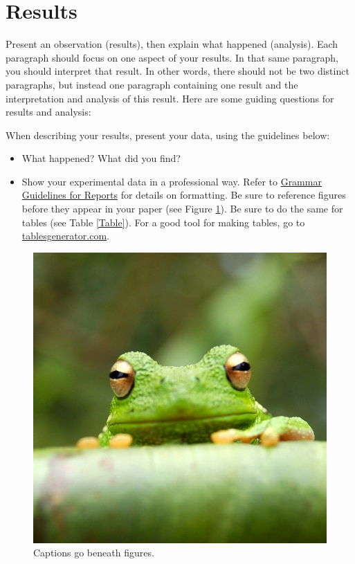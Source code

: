 \documentclass[a4paper]{article}
\begin{document}

\section* {Results}
Present an observation (results), then explain what happened (analysis).  Each paragraph should focus on one aspect of your results. In that same paragraph, you should interpret that result.
In other words, there should not be two distinct paragraphs, but instead one paragraph containing one result and the interpretation and analysis of this result. Here are some guiding questions for results and analysis:

When describing your results, present your data, using the guidelines below:
\begin{itemize}
	\item What happened? What did you find?
	\item Show your experimental data in a professional way. Refer to \href{https://confluence.cornell.edu/display/AGUACLARA/Grammar+Guidelines+for+Reports}{Grammar Guidelines for Reports} for details on formatting. Be sure to reference figures before they appear in your paper (see Figure \ref{Frog}). Be sure to do the same for tables (see Table \ref{Table}). For a good tool for making tables, go to \href{www.tablesgenerator.com}{tablesgenerator.com}.
\end{itemize}

\begin{figure}[H]
	\centering
	\includegraphics[scale=0.1]{./figures/frog}
	\caption{Captions go beneath figures.}
	\label{Frog}
\end{figure}
\end{document}
